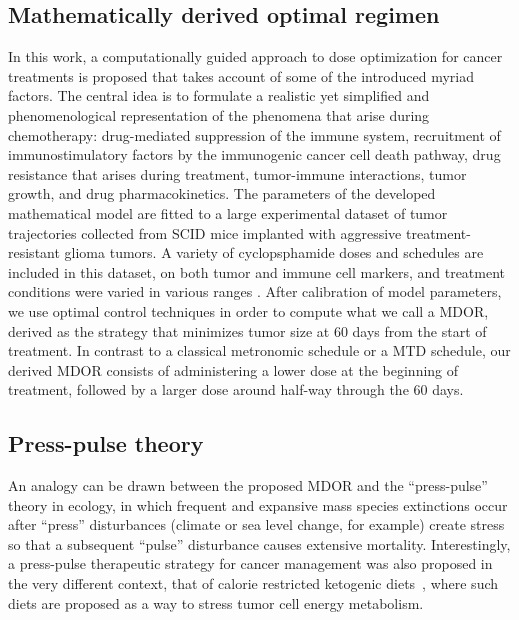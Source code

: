 \subsection{Mathematically derived optimal regimen}
In this work, a computationally guided approach to dose optimization for cancer treatments is proposed that takes account of some of the introduced myriad factors. The central idea is to formulate a realistic yet simplified and phenomenological representation of the phenomena that arise during chemotherapy: drug-mediated suppression of the immune system, recruitment of immunostimulatory factors by the immunogenic cancer cell death pathway, drug resistance that arises during treatment, tumor-immune interactions, tumor growth, and drug pharmacokinetics. The parameters of the developed mathematical model are fitted to a large experimental dataset of tumor trajectories collected from \ac{SCID} mice implanted with aggressive treatment-resistant glioma tumors. A variety of cyclopsphamide doses and schedules are included in this dataset, on both tumor and immune cell markers, and treatment conditions were varied in various ranges \cite{wu2014metronomic}. 
After calibration of model parameters, we use optimal control techniques in order to compute what we call a \acf{MDOR}, derived as the strategy that minimizes tumor size at 60 days from the start of treatment. In contrast to a classical metronomic schedule or a \acf{MTD} schedule, our derived MDOR consists of administering a lower dose at the beginning of treatment, followed by a larger dose around half-way through the 60 days.

\subsection{Press-pulse theory}
An analogy can be drawn between the proposed \ac{MDOR} and the ``press-pulse'' theory in ecology, in which frequent and expansive mass species extinctions occur after ``press'' disturbances (climate or sea level change, for example) create stress so that a subsequent ``pulse'' disturbance causes extensive mortality.
Interestingly, a press-pulse therapeutic strategy for cancer management was also proposed in the very different context, that of calorie restricted ketogenic diets~\cite{2017_seyfried}, where such diets are proposed as a way to stress tumor cell energy metabolism.

